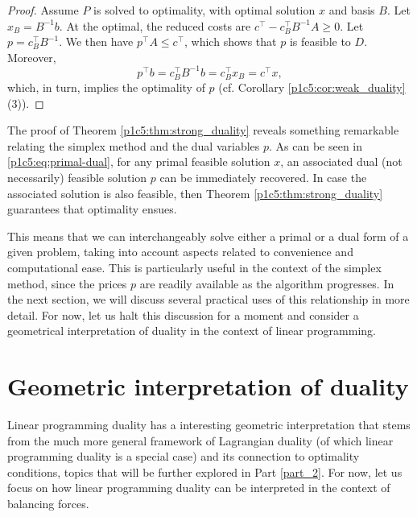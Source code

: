 \begin{proof}
	Assume $P$ is solved to optimality, with optimal solution $x$ and basis $B$. Let $x_B = B^{-1}b$. At the optimal, the reduced costs are $c^\top - c_B^\top B^{-1}A \geq 0$. Let $p = c_B^\top B^{-1}$. We then have $p^\top A \leq c^\top$, which shows that $p$ is feasible to $D$. Moreover,
%
	\begin{equation} \label{p1c5:eq:primal-dual}
		p^\top b = c_B^\top B^{-1}b = c_B^\top x_B = c^\top x,			
	\end{equation}
%
which, in turn, implies the optimality of $p$ (cf. Corollary \ref{p1c5:cor:weak_duality} (3)). \qedhere
\end{proof}

The proof of Theorem \ref{p1c5:thm:strong_duality} reveals something remarkable relating the simplex method and the dual variables $p$. As can be seen in \eqref{p1c5:eq:primal-dual}, for any primal feasible solution $x$, an associated dual (not necessarily) feasible solution $p$ can be immediately recovered. In case the associated solution is also feasible, then Theorem \ref{p1c5:thm:strong_duality} guarantees that optimality ensues.

This means that we can interchangeably solve either a primal or a dual form of a given problem, taking into account aspects related to convenience and computational ease. This is particularly useful in the context of the simplex method, since the prices $p$ are readily available as the algorithm progresses. In the next section, we will discuss several practical uses of this relationship in more detail. For now, let us halt this discussion for a moment and consider a geometrical interpretation of duality in the context of linear programming.


\section{Geometric interpretation of duality}

Linear programming duality has a interesting geometric interpretation that stems from the much more general framework of Lagrangian duality (of which linear programming duality is a special case) and its connection to optimality conditions, topics that will be further explored in Part \ref{part_2}. For now, let us focus on how linear programming duality can be interpreted in the context of balancing forces. 

